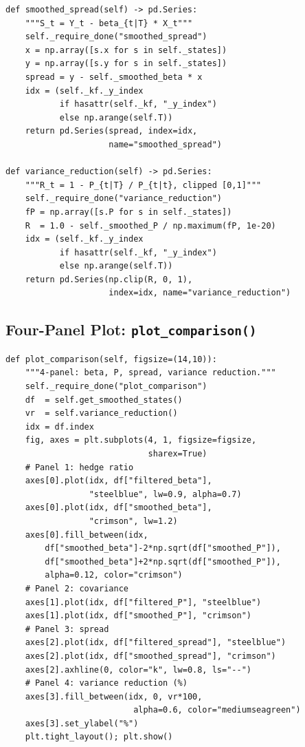 \documentclass[10pt,a4paper,twocolumn]{article}
\begin{document}
\begin{tcolorbox}[codebox={Spread and Variance Reduction}]
\begin{lstlisting}[style=pythonplain]
def smoothed_spread(self) -> pd.Series:
    """S_t = Y_t - beta_{t|T} * X_t"""
    self._require_done("smoothed_spread")
    x = np.array([s.x for s in self._states])
    y = np.array([s.y for s in self._states])
    spread = y - self._smoothed_beta * x
    idx = (self._kf._y_index
           if hasattr(self._kf, "_y_index")
           else np.arange(self.T))
    return pd.Series(spread, index=idx,
                     name="smoothed_spread")

def variance_reduction(self) -> pd.Series:
    """R_t = 1 - P_{t|T} / P_{t|t}, clipped [0,1]"""
    self._require_done("variance_reduction")
    fP = np.array([s.P for s in self._states])
    R  = 1.0 - self._smoothed_P / np.maximum(fP, 1e-20)
    idx = (self._kf._y_index
           if hasattr(self._kf, "_y_index")
           else np.arange(self.T))
    return pd.Series(np.clip(R, 0, 1),
                     index=idx, name="variance_reduction")
\end{lstlisting}
\end{tcolorbox}

\subsection{Four-Panel Plot: \texttt{plot\_comparison()}}

\begin{tcolorbox}[codebox={Comparison Plot}]
\begin{lstlisting}[style=pythonplain]
def plot_comparison(self, figsize=(14,10)):
    """4-panel: beta, P, spread, variance reduction."""
    self._require_done("plot_comparison")
    df  = self.get_smoothed_states()
    vr  = self.variance_reduction()
    idx = df.index
    fig, axes = plt.subplots(4, 1, figsize=figsize,
                             sharex=True)
    # Panel 1: hedge ratio
    axes[0].plot(idx, df["filtered_beta"],
                 "steelblue", lw=0.9, alpha=0.7)
    axes[0].plot(idx, df["smoothed_beta"],
                 "crimson", lw=1.2)
    axes[0].fill_between(idx,
        df["smoothed_beta"]-2*np.sqrt(df["smoothed_P"]),
        df["smoothed_beta"]+2*np.sqrt(df["smoothed_P"]),
        alpha=0.12, color="crimson")
    # Panel 2: covariance
    axes[1].plot(idx, df["filtered_P"], "steelblue")
    axes[1].plot(idx, df["smoothed_P"], "crimson")
    # Panel 3: spread
    axes[2].plot(idx, df["filtered_spread"], "steelblue")
    axes[2].plot(idx, df["smoothed_spread"], "crimson")
    axes[2].axhline(0, color="k", lw=0.8, ls="--")
    # Panel 4: variance reduction (%)
    axes[3].fill_between(idx, 0, vr*100,
                          alpha=0.6, color="mediumseagreen")
    axes[3].set_ylabel("%")
    plt.tight_layout(); plt.show()
\end{lstlisting}
\end{tcolorbox}
\end{document}
